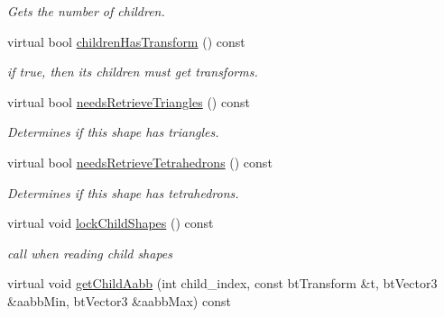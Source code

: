 \begin{CompactItemize}
\begin{CompactList}\small\item\em Gets the number of children. \item\end{CompactList}\item 
\hypertarget{classbt_g_impact_mesh_shape_5693f6e8b6288091ed4bfd445fed1f3e}{
virtual bool \hyperlink{classbt_g_impact_mesh_shape_5693f6e8b6288091ed4bfd445fed1f3e}{childrenHasTransform} () const }
\label{classbt_g_impact_mesh_shape_5693f6e8b6288091ed4bfd445fed1f3e}

\begin{CompactList}\small\item\em if true, then its children must get transforms. \item\end{CompactList}\item 
\hypertarget{classbt_g_impact_mesh_shape_946835fca3b128e784ae150a4a4d3abd}{
virtual bool \hyperlink{classbt_g_impact_mesh_shape_946835fca3b128e784ae150a4a4d3abd}{needsRetrieveTriangles} () const }
\label{classbt_g_impact_mesh_shape_946835fca3b128e784ae150a4a4d3abd}

\begin{CompactList}\small\item\em Determines if this shape has triangles. \item\end{CompactList}\item 
\hypertarget{classbt_g_impact_mesh_shape_732b818ef16f33c57f0fe13dcfe2e1a3}{
virtual bool \hyperlink{classbt_g_impact_mesh_shape_732b818ef16f33c57f0fe13dcfe2e1a3}{needsRetrieveTetrahedrons} () const }
\label{classbt_g_impact_mesh_shape_732b818ef16f33c57f0fe13dcfe2e1a3}

\begin{CompactList}\small\item\em Determines if this shape has tetrahedrons. \item\end{CompactList}\item 
\hypertarget{classbt_g_impact_mesh_shape_569599b4c909a948c3489ca351ce3b89}{
virtual void \hyperlink{classbt_g_impact_mesh_shape_569599b4c909a948c3489ca351ce3b89}{lockChildShapes} () const }
\label{classbt_g_impact_mesh_shape_569599b4c909a948c3489ca351ce3b89}

\begin{CompactList}\small\item\em call when reading child shapes \item\end{CompactList}\item 
\hypertarget{classbt_g_impact_mesh_shape_92be12fb67279fcb6f8bf47c9d6608a9}{
virtual void \hyperlink{classbt_g_impact_mesh_shape_92be12fb67279fcb6f8bf47c9d6608a9}{getChildAabb} (int child\_\-index, const btTransform \&t, btVector3 \&aabbMin, btVector3 \&aabbMax) const }
\label{classbt_g_impact_mesh_shape_92be12fb67279fcb6f8bf47c9d6608a9}


\end{CompactItemize}
